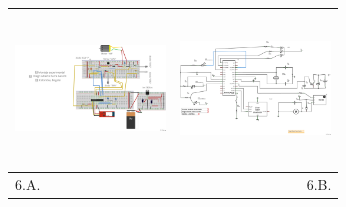 \documentclass[12]{article}
\newenvironment{Figure}
{\par\medskip\noindent\minipage{\linewidth}}
{\endminipage\par\medskip}
\begin{document}
\begin{multicols}{2}
\begin{Figure}	
\center
\begin{tabular}{|l|r|}
\hline
\includegraphics[width=4cm, height=4cm]{img/montajep.png} & \includegraphics[width=4cm, height=4cm]{img/esquemap.png} \\ \hline
6.A. & 6.B. \\ \hline
\end{tabular}
\label{fig:g6}
\end{Figure}
\vspace{0.6 cm}


\end{multicols}
\end{document}
